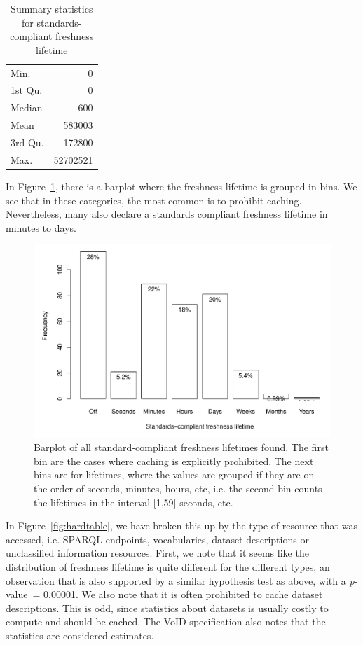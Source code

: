 \documentclass{llncs}
\newcommand{\pvalue}{\textit{p}-value\ }
\begin{document}
\begin{table}[ht]
\begin{center}
\caption{Summary statistics for standards-compliant freshness lifetime}\label{tab:summaryhard}
\begin{tabular}{lr}
Min.   &       0   \\ 
1st Qu.&       0   \\ 
Median &     600   \\ 
Mean   &  583003   \\ 
3rd Qu.&  172800   \\ 
Max.   & 52702521   \\ 
   \hline
\end{tabular}
\end{center}
\end{table}

In Figure~\ref{fig:hardall}, there is a barplot where
the freshness lifetime is grouped in bins. We see that in these
categories, the most common is to prohibit caching. Nevertheless, many
also declare a standards compliant freshness lifetime in minutes to
days.

\begin{figure}[ht]
  \centerline{%
    \includegraphics[width=.9\textwidth]{hardall.pdf}}
  \caption{Barplot of all standard-compliant freshness lifetimes
    found. The first bin are the cases where caching is explicitly
    prohibited. The next bins are for lifetimes, where the values are
    grouped if they are on the order of seconds, minutes, hours, etc,
    i.e. the second bin counts the lifetimes in the interval [1,59]
    seconds, etc.}
  \label{fig:hardall}
\end{figure}



In Figure~\ref{fig:hardtable}, we have broken this
up by the type of resource that was accessed, i.e. SPARQL endpoints,
vocabularies, dataset descriptions or unclassified information
resources. First, we note that it seems like the distribution of
freshness lifetime is quite different for the different types, an
observation that is also supported by a similar hypothesis test as
above, with a \pvalue = 0.00001. We also note that it is often
prohibited to cache dataset descriptions. This is odd, since
statistics about datasets is usually costly to compute and should be
cached. The VoID specification \cite{voidnote} also notes that the
statistics are considered estimates.
\end{document}
